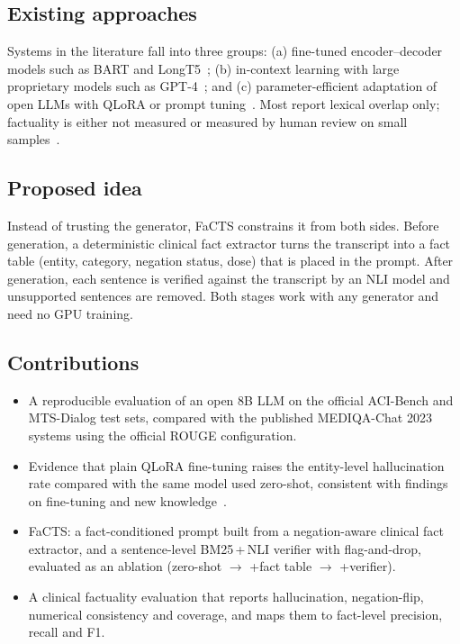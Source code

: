\documentclass[conference]{IEEEtran}
\begin{document}
\subsection{Existing approaches}
Systems in the literature fall into three groups: (a) fine-tuned encoder--decoder models such as BART and
LongT5~\cite{sharma2023cadence,abacha2023mts}; (b) in-context learning with large proprietary models such as
GPT-4~\cite{giorgi2023wanglab,abacha2023overview}; and (c) parameter-efficient adaptation of open LLMs with
QLoRA or prompt tuning~\cite{vanveen2024,lyu2024}. Most report lexical overlap only; factuality is either
not measured or measured by human review on small samples~\cite{giorgi2023wanglab,vanveen2024}.

\subsection{Proposed idea}
Instead of trusting the generator, FaCTS constrains it from both sides. Before generation, a deterministic
clinical fact extractor turns the transcript into a fact table (entity, category, negation status, dose)
that is placed in the prompt. After generation, each sentence is verified against the transcript by an
NLI model and unsupported sentences are removed. Both stages work with any generator and need no GPU
training.

\subsection{Contributions}
\begin{itemize}
\item A reproducible evaluation of an open 8B LLM on the official ACI-Bench and MTS-Dialog test sets,
  compared with the published MEDIQA-Chat 2023 systems using the official ROUGE configuration.
\item Evidence that plain QLoRA fine-tuning raises the entity-level hallucination rate compared with the
  same model used zero-shot, consistent with findings on fine-tuning and new knowledge~\cite{gekhman2024}.
\item FaCTS: a fact-conditioned prompt built from a negation-aware clinical fact extractor, and a
  sentence-level BM25\,+\,NLI verifier with flag-and-drop, evaluated as an ablation (zero-shot $\rightarrow$
  +fact table $\rightarrow$ +verifier).
\item A clinical factuality evaluation that reports hallucination, negation-flip, numerical consistency and
  coverage, and maps them to fact-level precision, recall and F1.
\end{itemize}
\end{document}
